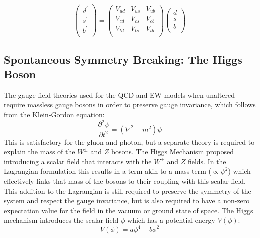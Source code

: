 		\begin{equation}
		\begin{pmatrix}
		d^\prime \\
		s^\prime\\
		b^\prime \\
		\end{pmatrix}
		 = \begin{pmatrix}
		V_{ud} & V_{us} & V_{ub} \\
		V_{cd} & V_{cs} & V_{cb} \\
		V_{td} & V_{ts} & V_{tb} \\
		\end{pmatrix}
	    \begin{pmatrix}
	    d \\
	    s\\
	    b \\
	    \end{pmatrix}
		\end{equation}



	\subsection{Spontaneous Symmetry Breaking: The Higgs Boson}
	\label{t:symbreak}

	The gauge field theories used for the QCD and EW models when unaltered require massless gauge bosons in order to preserve gauge invariance, which follows from the Klein-Gordon equation:
	\begin{equation}
		\frac{\partial^2\psi}{\partial t^2} = (\nabla^2 - m^2)\psi
	\end{equation}
	 This is satisfactory for the gluon and photon, but a separate theory is required to explain the mass of the $W^\pm$ and $Z$ bosons. The Higgs Mechanism proposed introducing a scalar field that interacts with the $W^\pm$ and $Z$ fields. In the Lagrangian formulation this results in a term akin to a mass term ($\propto\psi^2$) which effectively links that mass of the bosons to their coupling with this scalar field. This addition to the Lagrangian is still required to preserve the symmetry of the system and respect the gauge invariance, but is also required to have a non-zero expectation value for the field in the vacuum or ground state of space. The Higgs mechanism introduces the scalar field $\phi$ which has a potential energy $V(\phi)$:
	 \begin{equation}
		 V(\phi) = a\phi^4 - b\phi^2
	 \end{equation}

